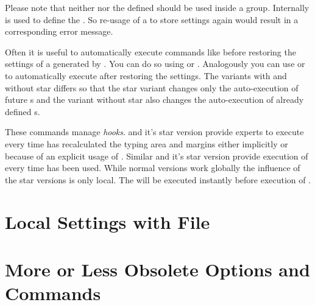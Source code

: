 Please note that neither  nor the
defined  should be used inside a group. Internally
 is
used to define the . So re-usage of a
 to store settings again would result in a
corresponding error message.

Often it is useful to automatically
execute commands like  before
restoring the settings of a  generated by
. You can do so using  or
. Analogously you can use 
or  to automatically execute  after
restoring the settings. The variants with and without star differs so that the
star variant changes only the auto-execution  of future
s and the variant without star also changes the auto-execution
 of already defined s.
%
\EndIndexGroup


\begin{Declaration}
\end{Declaration}%
These commands manage \emph{hooks}.  and it's
star version provide experts to execute  every time
 has recalculated the typing area and margins either
implicitly or because of an explicit usage of
. Similar
 and it's star
version provide execution of  every time
 has been used. While normal versions work
globally the influence of the star versions is only local. The
 will be executed instantly before execution of
.%
% 
\EndIndexGroup


\section{Local Settings with File }
\BeginIndexGroup
{}

%
\EndIndexGroup

\section{More or Less Obsolete Options and Commands}
%
\EndIndexGroup

\endinput

